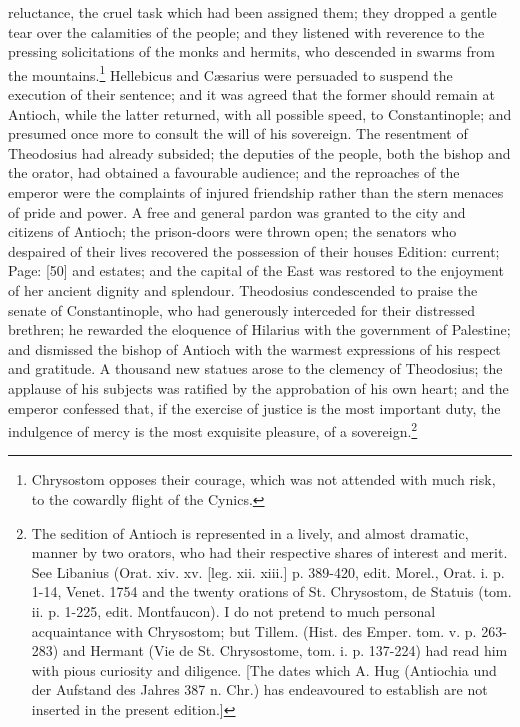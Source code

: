 reluctance, the cruel task which had been assigned them; they dropped a gentle tear over the calamities of the people; and they listened with reverence to the pressing solicitations of the monks and hermits, who descended in swarms from the mountains.\footnote{Chrysostom opposes their courage, which was not attended with much risk, to the cowardly flight of the Cynics.} Hellebicus and Cæsarius were persuaded to suspend the execution of their sentence; and it was agreed that the former should remain at Antioch, while the latter returned, with all possible speed, to Constantinople; and presumed once more to consult the will of his sovereign. The resentment of Theodosius had already subsided; the deputies of the people, both the bishop and the orator, had obtained a favourable audience; and the reproaches of the emperor were the complaints of injured friendship rather than the stern menaces of pride and power. A free and general pardon was granted to the city and citizens of Antioch; the prison-doors were thrown open; the senators who despaired of their lives recovered the possession of their houses Edition: current; Page: [50] and estates; and the capital of the East was restored to the enjoyment of her ancient dignity and splendour. Theodosius condescended to praise the senate of Constantinople, who had generously interceded for their distressed brethren; he rewarded the eloquence of Hilarius with the government of Palestine; and dismissed the bishop of Antioch with the warmest expressions of his respect and gratitude. A thousand new statues arose to the clemency of Theodosius; the applause of his subjects was ratified by the approbation of his own heart; and the emperor confessed that, if the exercise of justice is the most important duty, the indulgence of mercy is the most exquisite pleasure, of a sovereign.\footnote{The sedition of Antioch is represented in a lively, and almost dramatic, manner by two orators, who had their respective shares of interest and merit. See Libanius (Orat. xiv. xv. [leg. xii. xiii.] p. 389-420, edit. Morel., Orat. i. p. 1-14, Venet. 1754 and the twenty orations of St. Chrysostom, de Statuis (tom. ii. p. 1-225, edit. Montfaucon). I do not pretend to much personal acquaintance with Chrysostom; but Tillem. (Hist. des Emper. tom. v. p. 263-283) and Hermant (Vie de St. Chrysostome, tom. i. p. 137-224) had read him with pious curiosity and diligence. [The dates which A. Hug (Antiochia und der Aufstand des Jahres 387 n. Chr.) has endeavoured to establish are not inserted in the present edition.]}

